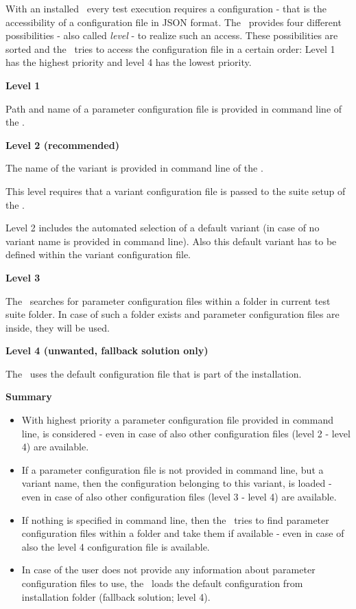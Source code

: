With an installed \pkg\ every test execution requires a configuration - that is the accessibility
of a configuration file in JSON format. The \pkg\ provides four different possibilities - also
called \textit{level} - to realize such an access. These possibilities are sorted and the \pkg\ tries to access
the configuration file in a certain order: Level 1 has the highest priority and level 4 has the lowest priority.

\textbf{Level 1}

Path and name of a parameter configuration file is provided in command line of the \rfwcore.

\textbf{Level 2 (recommended)}

The name of the variant is provided in command line of the \rfwcore.

This level requires that a variant configuration file is passed to the suite setup of the \pkg.

Level 2 includes the automated selection of a default variant (in case of no variant name is provided in command line).
Also this default variant has to be defined within the variant configuration file.

\textbf{Level 3}

The \pkg\ searches for parameter configuration files within a folder  in current test suite folder.
In case of such a folder exists and parameter configuration files are inside, they will be used.

\textbf{Level 4 (unwanted, fallback solution only)}

The \pkg\ uses the default configuration file that is part of the installation.

\vspace{2ex}

\textbf{Summary}

\begin{itemize}
   \item With highest priority a parameter configuration file provided in command line, is considered - even in case of also other
configuration files (level 2 - level 4) are available.
   \item If a parameter configuration file is not provided in command line, but a variant name, then the configuration belonging
to this variant, is loaded - even in case of also other configuration files (level 3 - level 4) are available.
   \item If nothing is specified in command line, then the \pkg\ tries to find parameter configuration files within a  folder
and take them if available - even in case of also the level 4 configuration file is available.
   \item In case of the user does not provide any information about parameter configuration files to use, the \pkg\ loads the
default configuration from installation folder (fallback solution; level 4).
\end{itemize}

